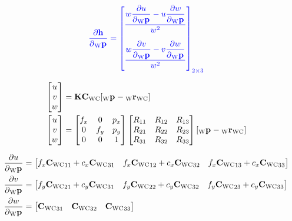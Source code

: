 \begin{align}
  \color{blue}
  \dfrac{\partial{\projFunc}}{\partial{\Pt{\world}}} =
  \begin{bmatrix}
    \dfrac{
      w \dfrac{\partial{u}}{\partial{\Pt{\world}}} -
      u \dfrac{\partial{w}}{\partial{\Pt{\world}}}
    }{w^{2}} \vspace{1.0em} \\
    \dfrac{
      w \dfrac{\partial{v}}{\partial{\Pt{\world}}} -
      v \dfrac{\partial{w}}{\partial{\Pt{\world}}}
    }{w^{2}} \vspace{0.5em}
  \end{bmatrix}_{2 \times 3}
\end{align}

\begin{align}
  \begin{bmatrix} u \\ v \\ w \end{bmatrix}
    &= \Mat{K} \camRot [\Pt{\world} - \camPos]
    \nonumber \\
  \begin{bmatrix} u \\ v \\ w \end{bmatrix}
  &= \begin{bmatrix}
      f_x & 0 & p_x \\
      0 & f_y & p_y \\
      0 & 0 & 1
  \end{bmatrix}
  \begin{bmatrix}
      R_{11} & R_{12} & R_{13} \\
      R_{21} & R_{22} & R_{23} \\
      R_{31} & R_{32} & R_{33}
  \end{bmatrix}
  [\Pt{\world} - \camPos]
  \nonumber
\end{align}

\begin{align}
  \dfrac{\partial{u}}{\partial{\Pt{\world}}} &=
    \begin{bmatrix}
      f_{x} \camRot_{11} + c_{x} \camRot_{31} &
      f_{x} \camRot_{12} + c_{x} \camRot_{32} &
      f_{x} \camRot_{13} + c_{x} \camRot_{33}
    \end{bmatrix} \\
  \dfrac{\partial{v}}{\partial{\Pt{\world}}} &=
    \begin{bmatrix}
      f_{y} \camRot_{21} + c_{y} \camRot_{31} &
      f_{y} \camRot_{22} + c_{y} \camRot_{32} &
      f_{y} \camRot_{23} + c_{y} \camRot_{33}
    \end{bmatrix} \\
  \dfrac{\partial{w}}{\partial{\Pt{\world}}} &=
    \begin{bmatrix}
      \camRot_{31} &
      \camRot_{32} &
      \camRot_{33}
    \end{bmatrix}
\end{align}


